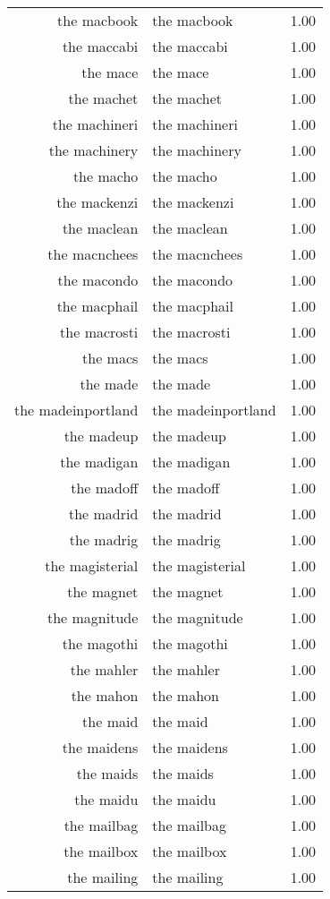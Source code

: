 \begin{table}[ht]
\begin{tabular}{rlr}
  the macbook & the macbook & 1.00 \\ 
  the maccabi & the maccabi & 1.00 \\ 
  the mace & the mace & 1.00 \\ 
  the machet & the machet & 1.00 \\ 
  the machineri & the machineri & 1.00 \\ 
  the machinery & the machinery & 1.00 \\ 
  the macho & the macho & 1.00 \\ 
  the mackenzi & the mackenzi & 1.00 \\ 
  the maclean & the maclean & 1.00 \\ 
  the macnchees & the macnchees & 1.00 \\ 
  the macondo & the macondo & 1.00 \\ 
  the macphail & the macphail & 1.00 \\ 
  the macrosti & the macrosti & 1.00 \\ 
  the macs & the macs & 1.00 \\ 
  the made & the made & 1.00 \\ 
  the madeinportland & the madeinportland & 1.00 \\ 
  the madeup & the madeup & 1.00 \\ 
  the madigan & the madigan & 1.00 \\ 
  the madoff & the madoff & 1.00 \\ 
  the madrid & the madrid & 1.00 \\ 
  the madrig & the madrig & 1.00 \\ 
  the magisterial & the magisterial & 1.00 \\ 
  the magnet & the magnet & 1.00 \\ 
  the magnitude & the magnitude & 1.00 \\ 
  the magothi & the magothi & 1.00 \\ 
  the mahler & the mahler & 1.00 \\ 
  the mahon & the mahon & 1.00 \\ 
  the maid & the maid & 1.00 \\ 
  the maidens & the maidens & 1.00 \\ 
  the maids & the maids & 1.00 \\ 
  the maidu & the maidu & 1.00 \\ 
  the mailbag & the mailbag & 1.00 \\ 
  the mailbox & the mailbox & 1.00 \\ 
  the mailing & the mailing & 1.00 \\ 

\end{tabular}
\end{table}
